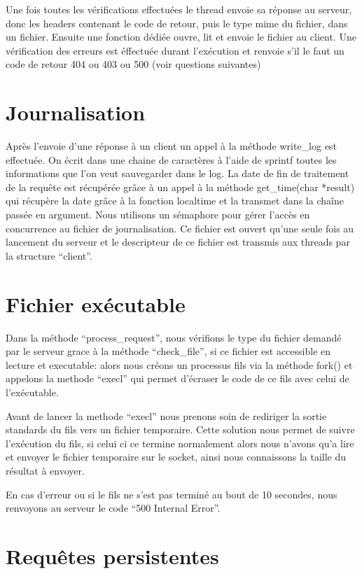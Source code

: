 \documentclass{article}
\begin{document}
Une fois toutes les vérifications effectuées le thread envoie sa réponse au serveur, donc les headers contenant le code de retour, puis le type mime du fichier, dans un fichier.
Ensuite une fonction dédiée ouvre, lit et envoie le fichier au client.
\hbox{}
Une vérification des erreurs est éffectuée durant l'exécution et renvoie s'il le faut un code de retour 404 ou 403 ou 500 (voir questions suivantes)

\section{Journalisation}

Après l'envoie d'une réponse à un client un appel à la méthode write\_log est effectuée.
On écrit dans une chaine de caractères à l'aide de sprintf toutes les informations que l'on veut sauvegarder dans le log. La date de fin de traitement de la requête est récupérée grâce à un appel
à la méthode get\_time(char *result) qui récupère la date grâce à la fonction localtime et la transmet dans la chaîne passée en argument.\hbox{}
Nous utilisons un sémaphore pour gérer l'accès en concurrence au fichier de journalisation. Ce fichier est ouvert qu'une seule fois au lancement du serveur et le descripteur de ce fichier est transmis
aux threads par la structure ``client''.

\section{Fichier exécutable}

Dans la méthode ``process\_request'', nous vérifions le type du fichier demandé par le serveur grace à la méthode ``check\_file'', si ce fichier est accessible en lecture et executable: alors nous créons un processus fils via la méthode fork() et appelons la methode ``execl'' qui permet d'écraser le code de ce fils avec celui de l'exécutable. \hbox{}

Avant de lancer la methode ``execl'' nous prenons soin de rediriger la sortie standards du fils vers un fichier temporaire. Cette solution nous permet de suivre l'exécution du fils, si celui ci ce termine normalement alors nous n'avons qu'a lire et envoyer le fichier temporaire sur le socket, ainsi nous connaissons la taille du résultat à envoyer.

En cas d'erreur ou si le fils ne s'est pas terminé au bout de 10 secondes, nous renvoyons au serveur le code ``500 Internal Error''.

\section{Requêtes persistentes}
\end{document}
